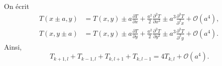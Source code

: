             On écrit 
            \begin{equation*}
                \begin{aligned}
                    T(x\pm a,y)
                    &=T(x,y)\pm a\frac{\partial T}{\partial x}+\frac{a^{2}}{2}\frac{\partial^{2}T}{\partial x^{2}}\pm a^{3}\frac{\partial^{3} T}{\partial^{3}x}+\mathcal{O}(a^{4}),\\
                    T(x,y\pm a)
                    &=T(x,y)\pm a\frac{\partial T}{\partial y}+\frac{a^{2}}{2}\frac{\partial^{2}T}{\partial y^{2}}\pm a^{3}\frac{\partial^{3} T}{\partial^{3} y}+\mathcal{O}(a^{4}).
                \end{aligned}
            \end{equation*}
            Ainsi,
            \begin{equation*}
                \boxed{
                    T_{k+1,l}+T_{k-1,l}+T_{k,l+1}+T_{k,l-1}=4T_{k,l}+\mathcal{O}(a^{4}).
                }
            \end{equation*}